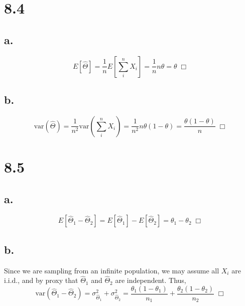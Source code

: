 \documentclass{article}
\newcommand{\var}{\mathrm{var}}
\begin{document}
\section*{8.4}
\subsection*{a.}
$$E[\hat{\Theta}] = \frac{1}{n}E[\sum\limits^n_i  X_i] = \frac{1}{n}n\theta = \theta \; \Box$$

\subsection*{b.}
$$\var(\hat{\Theta}) = \frac{1}{n^2} \var(\sum\limits^n_i X_i) = \frac{1}{n^2}n\theta(1-\theta) = \frac{\theta(1-\theta)}{n} \; \Box$$

\section*{8.5}
\subsection*{a.}
$$E[\hat{\Theta}_1 - \hat{\Theta}_2] = E[\hat{\Theta}_1] - E[\hat{\Theta}_2] = \theta_1 - \theta_2 \; \Box$$

\subsection*{b.}
Since we are sampling from an infinite population, we may assume all $X_i$ are i.i.d., and by proxy that $\hat{\Theta}_1$ and $\hat{\Theta}_2$ are independent. Thus,
$$\var(\hat{\Theta}_1 - \hat{\Theta}_2) = \sigma^2_{\hat{\Theta}_1} + \sigma^2_{\hat{\Theta}_2} = \frac{\theta_1(1-\theta_1)}{n_1} + \frac{\theta_2(1-\theta_2)}{n_2} \; \Box $$
\end{document}
